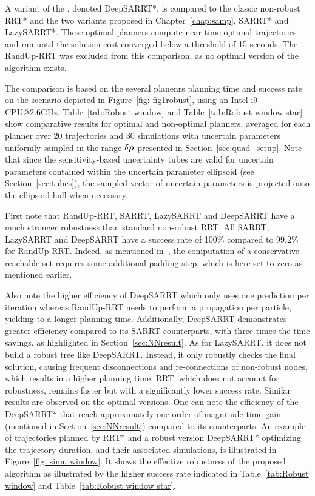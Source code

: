A  variant of the , denoted DeepSARRT*, is compared to the classic non-robust RRT* and the two variants proposed in Chapter~\ref{chap:samp}, SARRT* and LazySARRT*. 
These optimal planners compute near time-optimal trajectories and ran until the solution cost converged below a threshold of 15 seconds. 
The RandUp-RRT was excluded from this comparison, as no optimal version of the algorithm exists.

The comparison is based on the several planenrs planning time and success rate on the scenario depicted in Figure~\ref{fig: fig1robust}, using an Intel i9 CPU@2.6GHz.
Table~\ref{tab:Robust window} and Table~\ref{tab:Robust window star} show comparative results for optimal and non-optimal planners, averaged for each planner over 20 trajectories and 30 simulations with uncertain parameters uniformly sampled in the range $\delta\boldsymbol{p}$ presented in Section~\ref{sec:quad_setup}. 
Note that since the sensitivity-based uncertainty tubes are valid for uncertain parameters contained within the uncertain parameter ellipsoid (see Section~\ref{sec:tubes}), the sampled vector of uncertain parameters is projected onto the ellipsoid hull when necessary.

First note that RandUp-RRT, SARRT, LazySARRT and DeepSARRT have a much stronger robustness than standard non-robust RRT. 
All SARRT, LazySARRT and DeepSARRT have a success rate of 100\% compared to 99.2\% for RandUp-RRT. 
Indeed, as mentioned in~\cite{cRandUpRRT, cRandUP}, the computation of a conservative reachable set requires some additional padding step, which is here set to zero as mentioned earlier.

Also note the higher efficiency of DeepSARRT which only uses one prediction per iteration whereas RandUp-RRT needs to perform a propagation per particle, yielding to a longer planning time. 
Additionally, DeepSARRT demonstrates greater efficiency compared to its SARRT counterparts, with three times the time savings, as highlighted in Section~\ref{sec:NNresult}.
As for LazySARRT, it does not build a robust tree like DeepSARRT. 
Instead, it only robustly checks the final solution, causing frequent disconnections and re-connections of non-robust nodes, which results in a higher planning time.
RRT, which does not account for robustness, remains faster but with a significantly lower success rate. 
Similar results are observed on the optimal versions. 
One can note the efficiency of the DeepSARRT* that reach approximately one order of magnitude time gain (mentioned in Section~\ref{sec:NNresult}) compared to its  counterparts. 
An example of trajectories planned by RRT* and a robust version DeepSARRT* optimizing the trajectory duration, and their associated simulations, is illustrated in Figure~\ref{fig: simu window}.
It shows the effective robustness of the proposed algorithm as illustrated by the higher success rate indicated in Table~\ref{tab:Robust window} and Table~\ref{tab:Robust window star}.


